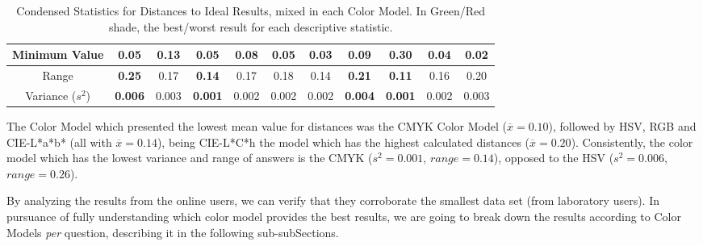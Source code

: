 \begin{table}[htbp]
{\begin{tabular}{@{}ccccccccccc@{}}
    \multicolumn{1}{c|}{Minimum Value}                                                 & 0.05  & 0.13       & 0.05                                   & 0.08  & \multicolumn{1}{c|}{0.05}                                  & 0.03                                  & 0.09       & 0.30                                   & 0.04                                  & \multicolumn{1}{c|}{0.02}  \\ \midrule
    \multicolumn{1}{c|}{Range}                                                         & \cellcolor[HTML]{FD6864}\textbf{0.25}  & 0.17       & \cellcolor[HTML]{32CB00}\textbf{0.14}  & 0.17  & \multicolumn{1}{c|}{0.18}                                  & 0.14                                  & \cellcolor[HTML]{FD6864}\textbf{0.21}       & \cellcolor[HTML]{32CB00}\textbf{0.11}  & 0.16                                  & \multicolumn{1}{c|}{0.20}  \\ \midrule
    \multicolumn{1}{c|}{Variance ($s^2$)}                                                      & \cellcolor[HTML]{FD6864}\textbf{0.006} & 0.003      & \cellcolor[HTML]{32CB00}\textbf{0.001} & 0.002 & \multicolumn{1}{c|}{0.002}                                 & 0.002                                 & \cellcolor[HTML]{FD6864}\textbf{0.004}      & \cellcolor[HTML]{32CB00}\textbf{0.001} & 0.002                                 & \multicolumn{1}{c|}{0.003} \\ \bottomrule
  \end{tabular}}
  \caption[Condensed Statistics for Distances to Ideal Results, mixed in each Color Model.]{Condensed Statistics for Distances to Ideal Results, mixed in each Color Model. In Green/Red shade, the best/worst result for each descriptive statistic.}
  \label{table:colormodels_distances_labonline_statistics}
\end{table}
%
The Color Model which presented the lowest mean value for distances was the CMYK Color Model ($\overline{x} = 0.10$), followed by HSV, RGB and CIE-L*a*b* (all with $\overline{x} = 0.14$), being
CIE-L*C*h the model which has the highest calculated distances ($\overline{x} = 0.20$). Consistently, the color model which has the lowest variance and range of answers is the CMYK ($s^2 = 0.001$,
$range = 0.14$), opposed to the HSV ($s^2 = 0.006$, $range = 0.26$). \par
%
By analyzing the results from the online users, we can verify that they corroborate the smallest data set (from laboratory users). In pursuance of fully understanding which color model provides the best results,
we are going to break down the results according to Color Models \emph{per} question, describing it in the following sub-subSections. \par
%
%
